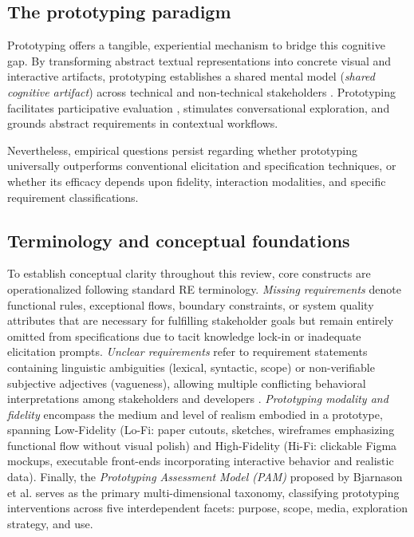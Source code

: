 \documentclass[conference]{IEEEtran}
\begin{document}
\subsection{The prototyping paradigm}
Prototyping offers a tangible, experiential mechanism to bridge this cognitive gap. By transforming abstract textual representations into concrete visual and interactive artifacts, prototyping establishes a shared mental model (\textit{shared cognitive artifact}) across technical and non-technical stakeholders \cite{bjarnason2023empirically}. Prototyping facilitates participative evaluation \cite{hickey1998prototyping}, stimulates conversational exploration, and grounds abstract requirements in contextual workflows.

Nevertheless, empirical questions persist regarding whether prototyping universally outperforms conventional elicitation and specification techniques, or whether its efficacy depends upon fidelity, interaction modalities, and specific requirement classifications.

\subsection{Terminology and conceptual foundations}
To establish conceptual clarity throughout this review, core constructs are operationalized following standard RE terminology. \textit{Missing requirements} denote functional rules, exceptional flows, boundary constraints, or system quality attributes that are necessary for fulfilling stakeholder goals but remain entirely omitted from specifications due to tacit knowledge lock-in or inadequate elicitation prompts. \textit{Unclear requirements} refer to requirement statements containing linguistic ambiguities (lexical, syntactic, scope) or non-verifiable subjective adjectives (vagueness), allowing multiple conflicting behavioral interpretations among stakeholders and developers \cite{cascon2025ambiguity}. \textit{Prototyping modality and fidelity} encompass the medium and level of realism embodied in a prototype, spanning Low-Fidelity (Lo-Fi: paper cutouts, sketches, wireframes emphasizing functional flow without visual polish) and High-Fidelity (Hi-Fi: clickable Figma mockups, executable front-ends incorporating interactive behavior and realistic data). Finally, the \textit{Prototyping Assessment Model (PAM)} proposed by Bjarnason et al. \cite{bjarnason2023empirically} serves as the primary multi-dimensional taxonomy, classifying prototyping interventions across five interdependent facets: purpose, scope, media, exploration strategy, and use.
\end{document}
